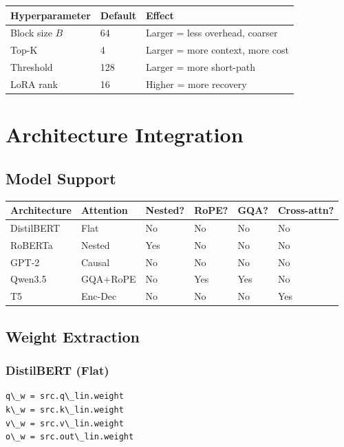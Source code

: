 \begin{table}[H]
\centering
\small
\begin{tabular}{lll}
\toprule
\textbf{Hyperparameter} & \textbf{Default} & \textbf{Effect} \\
\midrule
Block size $B$ & 64 & Larger = less overhead, coarser \\
Top-K & 4 & Larger = more context, more cost \\
Threshold & 128 & Larger = more short-path \\
LoRA rank & 16 & Higher = more recovery \\
\bottomrule
\end{tabular}
\end{table}



\section{Architecture Integration}

\subsection{Model Support}

\begin{table}[H]
\centering
\small
\begin{tabular}{llllll}
\toprule
\textbf{Architecture} & \textbf{Attention} & \textbf{Nested?} & \textbf{RoPE?} & \textbf{GQA?} & \textbf{Cross-attn?} \\
\midrule
DistilBERT & Flat & No & No & No & No \\
RoBERTa & Nested & Yes & No & No & No \\
GPT-2 & Causal & No & No & No & No \\
Qwen3.5 & GQA+RoPE & No & Yes & Yes & No \\
T5 & Enc-Dec & No & No & No & Yes \\
\bottomrule
\end{tabular}
\end{table}

\subsection{Weight Extraction}

\subsubsection{DistilBERT (Flat)}
\begin{lstlisting}
q\_w = src.q\_lin.weight
k\_w = src.k\_lin.weight
v\_w = src.v\_lin.weight
o\_w = src.out\_lin.weight
\end{lstlisting}

